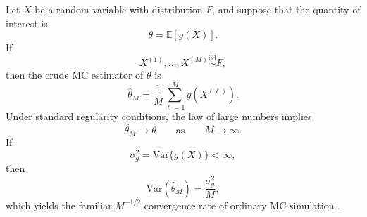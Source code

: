 \noindent
Let \(X\) be a random variable with distribution \(F\), and suppose that the
quantity of interest is
\begin{equation}
\label{eq:mc_target}
    \theta
    =
    \mathbb{E}[g(X)].
\end{equation}
If
\begin{equation}
\label{eq:mc_iid_sample}
    X^{(1)},\ldots,X^{(M)}
    \stackrel{\mathrm{iid}}{\sim}
    F,
\end{equation}
then the crude MC estimator of \(\theta\) is
\begin{equation}
\label{eq:mc_estimator}
    \widehat{\theta}_{M}
    =
    \frac{1}{M}
    \sum_{\ell=1}^{M}
    g
    \!\left(
        X^{(\ell)}
    \right).
\end{equation}
Under standard regularity conditions, the law of large numbers implies
\begin{equation}
\label{eq:mc_lln}
    \widehat{\theta}_{M}
    \longrightarrow
    \theta
    \qquad
    \text{as}
    \qquad
    M\longrightarrow\infty.
\end{equation}
If
\begin{equation}
\label{eq:mc_variance_condition}
    \sigma_g^2
    =
    \mathrm{Var}\{g(X)\}
    <
    \infty,
\end{equation}
then
\begin{equation}
\label{eq:mc_estimator_variance}
    \mathrm{Var}
    \!\left(
        \widehat{\theta}_{M}
    \right)
    =
    \frac{\sigma_g^2}{M},
\end{equation}
which yields the familiar \(M^{-1/2}\) convergence rate of ordinary MC
simulation \citep{caflisch1998monte,glasserman2004monte}.

